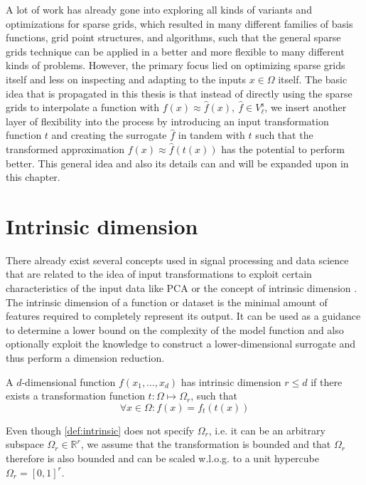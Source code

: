 \documentclass[
  a4paper,  %
  twoside,  %
  bibliography=totoc,
  headsepline,
  cleardoublepage=empty,
  parskip=half,
  draft=false
]{scrbook}
\begin{document}
A lot of work has already gone into exploring all kinds of variants and optimizations for sparse grids, which resulted in many different families of basis functions, grid point structures, and algorithms, such that the general sparse grids technique can be applied in a better and more flexible to many different kinds of problems.
However, the primary focus lied on optimizing sparse grids itself and less on inspecting and adapting to the inputs $x \in \Omega$ itself.
The basic idea that is propagated in this thesis is that instead of directly using the sparse grids to interpolate a function with $f(x) \approx \hat{f}(x), ~ \hat{f} \in V^{\text{s}}_{\ell}$, we insert another layer of flexibility into the process by introducing an input transformation function $t$ and creating the surrogate $\hat{f}$ in tandem with $t$ such that the transformed approximation $f(x) \approx \hat{f}(t(x))$ has the potential to perform better.
This general idea and also its details can and will be expanded upon in this chapter.

\section{Intrinsic dimension}

There already exist several concepts used in signal processing and data science that are related to the idea of input transformations to exploit certain characteristics of the input data like PCA \cite{} or the concept of intrinsic dimension \cite{}.
The intrinsic dimension of a function or dataset is the minimal amount of features required to completely represent its output.
It can be used as a guidance to determine a lower bound on the complexity of the model function and also optionally exploit the knowledge to construct a lower-dimensional surrogate and thus perform a dimension reduction.

\begin{definition}
A $d$-dimensional function $f(x_1, \dots, x_d)$ has intrinsic dimension $r \leq d$ if there exists a transformation function $t \colon \Omega \mapsto \Omega_r$, such that
\begin{equation}
\forall x \in \Omega \colon f(x)=f_t(t(x))
\end{equation}
\label{def:intrinsic}
\end{definition}

Even though \cref{def:intrinsic} does not specify $\Omega_r$, i.e. it can be an arbitrary subspace $\Omega_r \in \mathds{R}^r$, we assume that the transformation is bounded and that $\Omega_r$ therefore is also bounded and can be  scaled w.l.o.g. to a unit hypercube $\Omega_r=[0,1]^r$.
\end{document}
